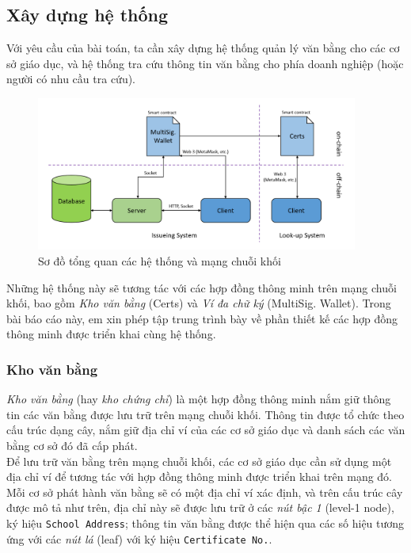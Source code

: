\newpage
\subsection{Xây dựng hệ thống}

Với yêu cầu của bài toán, ta cần xây dựng hệ thống quản lý văn bằng cho các cơ sở giáo dục, và hệ thống tra cứu thông tin văn bằng cho phía doanh nghiệp (hoặc người có nhu cầu tra cứu).\\

\begin{figure}[ht]
    \centering
    \includegraphics[width=400px]{images/system-overview.png}
    \caption{Sơ đồ tổng quan các hệ thống và mạng chuỗi khối}
    \label{images/system-overview}
\end{figure}

Những hệ thống này sẽ tương tác với các hợp đồng thông minh trên mạng chuỗi khối, bao gồm \textit{Kho văn bằng} (Certs) và \textit{Ví đa chữ ký} (MultiSig. Wallet). Trong bài báo cáo này, em xin phép tập trung trình bày về phần thiết kế các hợp đồng thông minh được triển khai cùng hệ thống.


\subsubsection{Kho văn bằng}
\textit{Kho văn bằng} (hay \textit{kho chứng chỉ}) là một hợp đồng thông minh nắm giữ thông tin các văn bằng được lưu trữ trên mạng chuỗi khối. Thông tin được tổ chức theo cấu trúc dạng cây, nắm giữ địa chỉ ví của các cơ sở giáo dục và danh sách các văn bằng cơ sở đó đã cấp phát.\\

Để lưu trữ văn bằng trên mạng chuỗi khối, các cơ sở giáo dục cần sử dụng một địa chỉ ví để tương tác với hợp đồng thông minh được triển khai trên mạng đó. Mỗi cơ sở phát hành văn bằng sẽ có một địa chỉ ví xác định, và trên cấu trúc cây được mô tả như trên, địa chỉ này sẽ được lưu trữ ở các \textit{nút bậc 1} (level-1 node), ký hiệu \texttt{School Address}; thông tin văn bằng được thể hiện qua các số hiệu tương ứng với các \textit{nút lá} (leaf) với ký hiệu \texttt{Certificate No.}.\\

